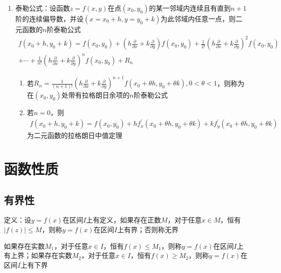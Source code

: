 \documentclass[12pt]{book}
\begin{document}
\begin{enumerate}[1.]
    \item 泰勒公式：设函数$z=f(x,y)$在点$(x_0,y_0)$的某一邻域内连续且有直到$n+1$阶的连续偏导数，并设$(x=x_{0}+h,y=y_{0}+k)$为此邻域内任意一点，则二元函数的$n$阶泰勒公式
    \begin{gather*}
        f(x_{0}+h,y_{0}+k)
        = f(x_{0},y_{0})
        + \left(h\frac{\partial}{\partial x}+k\frac{\partial}{\partial y} \right)f(x_{0},y_{0})
        + \frac{1}{2!} \left(h\frac{\partial}{\partial x}+k\frac{\partial}{\partial y} \right)^{2} f(x_{0},y_{0}) 
        \\+ \cdots 
        + \frac{1}{n!} \left(h\frac{\partial}{\partial x}+k\frac{\partial}{\partial y} \right)^{n} f(x_{0},y_{0}) 
        + R_{n}
    \end{gather*}
    \begin{enumerate}[(1)]
        \item 若$R_{n}=\frac{1}{(n+1)!} \left(h\frac{\partial}{\partial x}+k\frac{\partial}{\partial y} \right)^{n+1} f(x_{0}+\theta h,y_{0}+\theta k), 0<\theta<1 $，则称为在$(x_{0},y_{0})$处带有拉格朗日余项的$n$阶泰勒公式
        \item 若$n=0$，则
        \begin{gather*}
            f(x_{0}+h,y_{0}+k)
            = f(x_{0},y_{0})
            + h f^{\prime}_{x}(x_{0}+\theta h,y_{0}+\theta k) 
            + k f^{\prime}_{y}(x_{0}+\theta h,y_{0}+\theta k) 
        \end{gather*}
        为二元函数的拉格朗日中值定理
    \end{enumerate}
\end{enumerate}







\section{函数性质}


\subsection{有界性}

定义：设$y=f(x)$在区间$I$上有定义，如果存在正数$M$，对于任意$ x \in M$，恒有$|f(z)|\leq M$，则称$y=f(x)$在区间$I$上有界；否则称无界

如果存在实数$M_1$，对于任意$x\in I$，恒有$f(x)\leq M_1$，则称$y=f(x)$在区间$I$上有上界；如果存在实数$ M_2$，对于任意$x\in  I$，恒有$ f(x)\geq M_2$，则称$y=f(x)$在区间$I$上有下界
\end{document}
